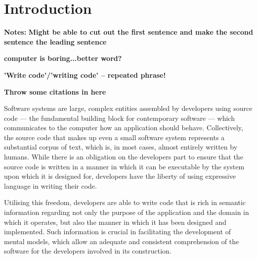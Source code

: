 \chapter{Introduction}
\label{chapter:Introduction} 




\textbf{Notes:}
\textbf{Might be able to cut out the first sentence and make the second sentence the leading sentence}

\textbf{computer is boring...better word?}

\textbf{'Write code'/'writing code' -- repeated phrase!}

\textbf{Throw some citations in here}

Software systems are large, complex entities assembled by developers using source code --- the fundamental building block for contemporary software --- which communicates to the computer how an application should behave. Collectively, the source code that makes up even a small software system represents a substantial corpus of text, which is, in most cases, almost entirely written by humans. While there is an obligation on the developers part to ensure that the source code is written in a manner in which it can be executable by the system upon which it is designed for, developers have the liberty of using expressive language in writing their code.

Utilising this freedom, developers are able to write code that is rich in semantic information regarding not only the purpose of the application and the domain in which it operates, but also the manner in which it has been designed and implemented. Such information is crucial in facilitating the development of mental models, which allow an adequate and consistent comprehension of the software for the developers involved in its construction.


